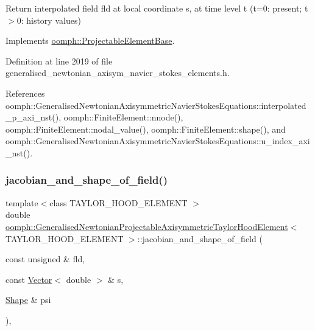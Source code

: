 Return interpolated field fld at local coordinate s, at time level t (t=0\+: present; t$>$0\+: history values) 



Implements \hyperlink{classoomph_1_1ProjectableElementBase_ae4da5b565b6d333be2f5920f7be763cd}{oomph\+::\+Projectable\+Element\+Base}.



Definition at line 2019 of file generalised\+\_\+newtonian\+\_\+axisym\+\_\+navier\+\_\+stokes\+\_\+elements.\+h.



References oomph\+::\+Generalised\+Newtonian\+Axisymmetric\+Navier\+Stokes\+Equations\+::interpolated\+\_\+p\+\_\+axi\+\_\+nst(), oomph\+::\+Finite\+Element\+::nnode(), oomph\+::\+Finite\+Element\+::nodal\+\_\+value(), oomph\+::\+Finite\+Element\+::shape(), and oomph\+::\+Generalised\+Newtonian\+Axisymmetric\+Navier\+Stokes\+Equations\+::u\+\_\+index\+\_\+axi\+\_\+nst().

\mbox{\label{classoomph_1_1GeneralisedNewtonianProjectableAxisymmetricTaylorHoodElement_a00a9a3ba14ff4202b64a8cdc21344b71}} 
\subsubsection{\texorpdfstring{jacobian\+\_\+and\+\_\+shape\+\_\+of\+\_\+field()}{jacobian\_and\_shape\_of\_field()}}
{\footnotesize\ttfamily template$<$class T\+A\+Y\+L\+O\+R\+\_\+\+H\+O\+O\+D\+\_\+\+E\+L\+E\+M\+E\+NT $>$ \\
double \hyperlink{classoomph_1_1GeneralisedNewtonianProjectableAxisymmetricTaylorHoodElement}{oomph\+::\+Generalised\+Newtonian\+Projectable\+Axisymmetric\+Taylor\+Hood\+Element}$<$ T\+A\+Y\+L\+O\+R\+\_\+\+H\+O\+O\+D\+\_\+\+E\+L\+E\+M\+E\+NT $>$\+::jacobian\+\_\+and\+\_\+shape\+\_\+of\+\_\+field (\begin{DoxyParamCaption}\item[{const unsigned \&}]{fld,  }\item[{const \hyperlink{classoomph_1_1Vector}{Vector}$<$ double $>$ \&}]{s,  }\item[{\hyperlink{classoomph_1_1Shape}{Shape} \&}]{psi }\end{DoxyParamCaption})\hspace{0.3cm}{\ttfamily [inline]}, {\ttfamily [virtual]}}




